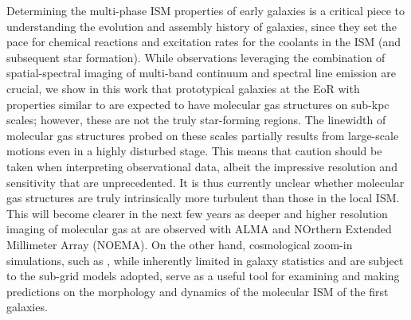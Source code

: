 \IfFileExists{emulateapjlegacy.cls}{\documentclass[iop]{emulateapjlegacy}}{\documentclass[iop]{emulateapj}}
\begin{document}
Determining the multi-phase ISM properties of early galaxies
is a critical piece to understanding the evolution and
assembly history of galaxies, since they set the pace
for chemical reactions and excitation rates for the coolants in the ISM (and subsequent star formation).
While observations leveraging the combination of spatial-spectral imaging of
multi-band continuum and spectral line emission are crucial, 
we show in this work that prototypical galaxies at the EoR with properties similar to \flower
are expected to have molecular gas structures on sub-kpc scales; however, these are not 
the truly star-forming regions. The linewidth of molecular gas structures probed on these scales partially results from 
large-scale motions even in a highly disturbed stage.
This means that caution should be taken when interpreting observational data, 
albeit the impressive resolution and sensitivity that are unprecedented. 
It is thus currently unclear whether \highz molecular gas structures are truly intrinsically more turbulent than those in the local ISM. 
This will become clearer in the next few years as deeper and higher resolution imaging of 
molecular gas at \highz are observed with ALMA and NOrthern Extended Millimeter Array (NOEMA). 
On the other hand, cosmological zoom-in simulations, such as , while inherently limited in galaxy
statistics and are subject to the sub-grid models adopted, serve as a useful tool for examining 
and making predictions on the morphology and dynamics of the molecular ISM of the first galaxies.


\acknowledgements
\end{document}
